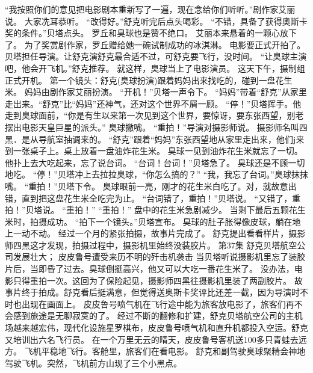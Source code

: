 \documentclass[a4paper,12pt,UTF8,twoside]{ctexbook}
\begin{document}
        “我按照你们的意见把电影剧本重新写了一遍，现在念给你们听听。”剧作家艾丽说。 
        大家冼耳恭听。 
        “改得好。”舒克听完后点头喝彩。 
        “不错，具备了获得奥斯卡奖的条件。”贝塔点头。 
        罗丘和臭球也是赞不绝口。 
        艾丽本来悬着的一颗心放下了。 
        为了奖赏剧作家，罗丘赠给她一碗试制成功的冰淇淋。 
        电影要正式开拍了。贝塔担任导演。让舒克演舒克最合适不过，可舒克要飞行，没时间。 
        “让臭球主演吧，他会开飞机。”舒克推荐。 
        就这样，臭球当上了电影演员。 
        这天下午，摄制组正式开机。 
        第一个镜头：舒克(臭球扮演)跟着妈妈出来找吃的，碰到一盘花生米。 
        妈妈由剧作家艾丽扮演。 
        “开机！”贝塔一声令下。 
        “妈妈”带着“舒克”从家里走出来。“舒克”比“妈妈”还神气，还对这个世界不屑一顾。 
        “停！”贝塔挥手。他走到臭球面前，“你是有生以来第一次见到这个世界，要惊讶，要东张西望，别老摆出电影天皇巨星的派头。” 
        臭球撇嘴。 
        “重拍！”导演对摄影师说。 
        摄影师名叫四黑．是从导航室抽调来的。 
        “舒克”跟着“妈妈”东张西望地从家里走出来，他们j来到一张桌子上。桌上放着一盘油炸花生米。 
        臭球一见到油炸花生米就忘了一切。他扑上去大吃起来，忘了说台词。 
        “台词！台词！”贝塔急了。 
        臭球还是不顾一切地吃。 
        “停！”贝塔冲上去拉拉臭球，“你怎么搞的？” 
        “我，我忘了台词。”臭球抹抹嘴。 
        “重拍！”贝塔下令。 
        臭球眼前一亮，刚才的花生米白吃了。对，就故意出错，直到把这盘花生米全吃完为止。 
        “台词错了，重拍！”贝塔说。 
        “又错了，重拍！”贝塔说。 
        “重拍！” 
        “重拍！” 
        盘中的花生米急剧减少。 
        当剩下最后五颗花生米时，拍摄成功。 
        “拍下一个镜头。”贝塔宣布。 
        臭球的肚子胀得像皮球，躺在地上一动不动。 
        经过一个月的紧张拍摄，故事片完成了。 
        舒克提出看看样片，摄影师四黑这才发现，拍摄过程中，摄影机里始终没装胶片。   第37集 
        舒克贝塔航空公司发展壮大； 
        皮皮鲁号遭受来历不明的歼击机袭击   
        当贝塔听说摄影机里忘了装胶片后，当即昏了过去。臭球倒挺高兴，他又可以大吃一番花生米了。 
        没办法，电影只得重拍一次。这回为了保险起见，摄影师四黑往摄影机里装了两副胶片。 
        故事片终于拍成。舒克看后挺满意，但觉得送奥斯卡奖评比还差一截，因为导演时不时也出现在画面上。 
        皮皮鲁号喷气机在飞行途中能为旅客放电影了，旅客们再不会感到旅途是无聊寂寞的了。 
        经过不断的翻修和扩建，舒克贝塔航空公司的主机场越来越宏伟，现代化设施星罗棋布，皮皮鲁号喷气机和直升机都投入空运。舒克又培训出六名飞行员。 
        在一个万里无云的晴天，皮皮鲁号客机送100多只青蛙去远方。 
        飞机平稳地飞行。客舱里，旅客们在看电影。 
        舒克和副驾驶臭球聚精会神地驾驶飞机。突然，飞机前方山现了三个小黑点。 
\end{document}
